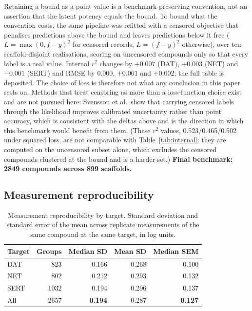 \documentclass[11pt,a4paper]{article}
\begin{document}
Retaining a bound as a point value is a benchmark-preserving convention, not an assertion
that the latent potency equals the bound. To bound what the convention costs, the same
pipeline was refitted with a censored objective that penalises predictions above the bound
and leaves predictions below it free ($L=\max(0,f-y)^2$ for censored records,
$L=(f-y)^2$ otherwise), over ten scaffold-disjoint realisations, scoring on uncensored
compounds only so that every label is a real value. Internal $r^2$ changes by $+0.007$
(DAT), $+0.003$ (NET) and $-0.001$ (SERT) and RMSE by $0.000$, $+0.001$ and $+0.002$; the
full table is deposited. The choice of loss is therefore not what any conclusion in this
paper rests on. Methods that treat censoring as more than a loss-function choice exist and
are not pursued here: Svensson et al.\ show that carrying censored labels through the
likelihood improves calibrated uncertainty rather than point accuracy, which is consistent
with the deltas above and is the direction in which this benchmark would benefit from
them.\cite{Svensson2025} (These $r^2$ values, 0.523/0.465/0.502 under squared loss, are not
comparable with Table~\ref{tab:internal}: they are computed on the uncensored subset
alone, which excludes the censored compounds clustered at the bound and is a harder set.)
\textbf{Final benchmark: 2849 compounds across 899 scaffolds.}

\subsection{Measurement reproducibility}
\label{sec:repro-floor}

\begin{table}[tb]
\centering
\small
\caption{Measurement reproducibility by target. Standard deviation and standard error
of the mean across replicate measurements of the same compound at the same target, in
log units.}
\label{tab:repro}
\begin{tabular}{lrrrr}
\toprule
Target & Groups & Median SD & Mean SD & Median SEM \\
\midrule
DAT  & 823   & 0.166 & 0.268 & 0.100 \\
NET  & 802   & 0.212 & 0.293 & 0.132 \\
SERT & 1032 & 0.194 & 0.296 & 0.137 \\
\midrule
All  & 2657 & \textbf{0.194} & 0.287 & \textbf{0.127} \\
\bottomrule
\end{tabular}
\end{table}
\end{document}
